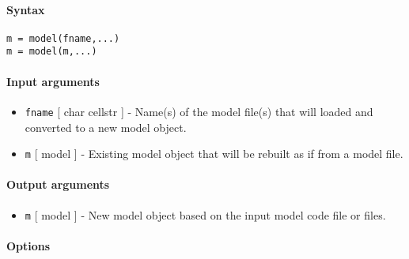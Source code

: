 


	\paragraph{Syntax}

\begin{verbatim}
m = model(fname,...)
m = model(m,...)
\end{verbatim}

\paragraph{Input arguments}

\begin{itemize}
\item
  \texttt{fname} {[} char \textbar{} cellstr {]} - Name(s) of the model
  file(s) that will loaded and converted to a new model object.
\item
  \texttt{m} {[} model {]} - Existing model object that will be rebuilt
  as if from a model file.
\end{itemize}

\paragraph{Output arguments}

\begin{itemize}
\itemsep1pt\parskip0pt
\item
  \texttt{m} {[} model {]} - New model object based on the input model
  code file or files.
\end{itemize}

\paragraph{Options}

